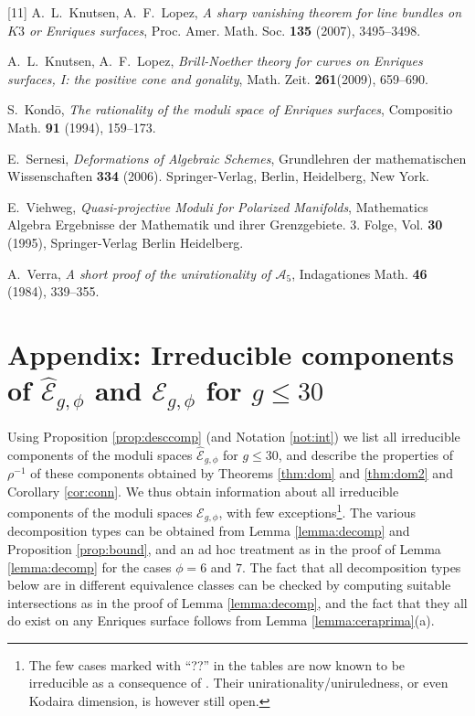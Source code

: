 \documentclass[11pt]{amsart}
\theoremstyle{definition}
\def\A{{\mathcal A}}
\def\E{{\mathcal E}}
\begin{document}
\begin{thebibliography}{[11]}
  A.~L.~Knutsen, A.~F.~Lopez, {\it A sharp vanishing theorem for line bundles on $K3$ or Enriques surfaces}, Proc. Amer. Math. Soc. {\bf  135} (2007), 3495--3498.

  A.~L.~Knutsen, A.~F.~Lopez, {\it Brill-Noether theory for curves on Enriques surfaces, I: the positive cone and gonality},  Math. Zeit. {\bf 261}(2009), 659--690. 



 S.~Kond{\=o}, {\it
The rationality of the moduli space of Enriques surfaces},
Compositio Math. {\bf 91}
(1994), 159--173. 








  E.~Sernesi, {\it Deformations of Algebraic Schemes},
 Grundlehren der mathematischen Wissenschaften {\bf 334} (2006). Springer-Verlag, Berlin, Heidelberg, New York. 



  E.~Viehweg, {\it Quasi-projective Moduli for Polarized Manifolds}, 
Mathematics Algebra
Ergebnisse der Mathematik und ihrer Grenzgebiete. 3. Folge, Vol. {\bf 30} (1995), Springer-Verlag Berlin Heidelberg. 





 A.~Verra, {\it A short proof of the unirationality of $\A_5$},  Indagationes Math. {\bf 46} (1984), 339--355. 





\end{thebibliography}


\newpage


\section*{Appendix:
  Irreducible components  of  $\widehat{\E}_{g,\phi}$ and  $\E_{g,\phi}$ for  $g \leqslant 30$}

{\small
Using  Proposition \ref{prop:desccomp}  (and Notation \ref{not:int})  we list all  irreducible  components of the moduli spaces $\widehat{\E}_{g,\phi}$ for $g \leqslant 30$,
and describe   the properties of $\rho^{-1}$ of these components obtained by Theorems \ref{thm:dom} and \ref{thm:dom2} and Corollary \ref{cor:conn}. We thus obtain  information about all  irreducible  components of the moduli spaces $\E_{g,\phi}$, with few exceptions\footnote{ The few cases marked with ``??'' in the tables are now known to be irreducible as a consequence of \cite[Thm. 1.1]{kn-JMPA}. Their unirationality/uniruledness, or even Kodaira dimension, is however still open.}. 
The various 
decomposition types can be obtained from 
Lemma \ref{lemma:decomp} and Proposition \ref{prop:bound}, and an ad hoc treatment as in the proof of Lemma \ref{lemma:decomp} for the cases $\phi=6$ and $7$.
The fact that all 
decomposition types below are  in different equivalence classes  can be checked by computing suitable intersections as in the proof of Lemma \ref{lemma:decomp}, and the fact that they all do exist on any Enriques surface follows from Lemma \ref{lemma:ceraprima}(a). 
}
\end{document}
